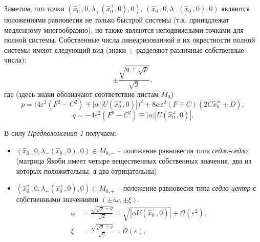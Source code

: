 Заметим, что точки $(\hat x^{+}_0, 0, \lambda_{+}(\hat x^{+}_0, 0), 0)$, $(\hat x^{-}_0, 0, \lambda_{-}(\hat x^{-}_0, 0), 0)$ являются положениями равновесия не только быстрой системы (т.к. принадлежат медленному многообразию), но также являются неподвижными точками для полной системы. Собственные числа линеаризованной в их окрестности полной системы имеют следующий вид (знаки $\pm$ разделяют различные собственные числа):
$$\pm \frac{\sqrt{q \pm \sqrt p}}{\sqrt 2},$$
где (здесь знаки обозначают соответствие листам $M_0$)
$$p = \Big(4 \varepsilon^2(F^2-C^2) \mp |\alpha| |U(\hat x_0^\pm,0)|\Big)^2 + 8 \alpha \varepsilon^2 (F \mp C) (2C \hat x_0^\pm +  D),$$
$$q = - 4 \varepsilon^2 (F^2 - C^2) \mp |\alpha| |U(\hat x_0^\pm,0)|.$$

В силу \textit{Предположения 1} получаем:
\begin{itemize}
\item $(\hat x^{-}_0, 0, \lambda_{-}(\hat x^{-}_0, 0), 0) \in M_{0,-}$ -- положение равновесия типа \textit{седло-седло} (матрица Якоби имеет четыре вещественных собственных значения, два из которых положительны, а два отрицательны)
\item $(\hat x^{+}_0, 0, \lambda_{+}(\hat x^{+}_0, 0), 0) \in M_{0,+}$ -- положение равновесия типа \textit{седло-центр} с собственными значениями $(\pm i \omega, \pm \xi)$.
    \begin{align*}
    \omega &= \frac{\sqrt{\sqrt p - q}}{\sqrt 2} = \sqrt{|\alpha U(\hat x_0^+,0)|} + \mathcal{O}(\varepsilon^2), \\
    \xi &=    \frac{\sqrt{\sqrt p + q}}{\sqrt 2} = \mathcal{O}(\varepsilon),
    \label{eigenval}
    \end{align*}
\end{itemize}

